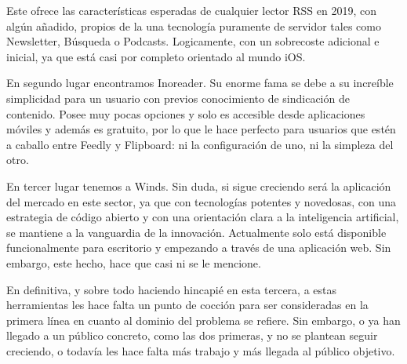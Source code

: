 Este ofrece las características esperadas de cualquier lector RSS en 2019, con algún añadido, propios de la una tecnología puramente de servidor tales como Newsletter, Búsqueda o Podcasts. Logicamente, con un sobrecoste adicional e inicial, ya que está casi por completo orientado al mundo iOS.

En segundo lugar encontramos Inoreader. Su enorme fama se debe a su increíble simplicidad para un usuario con previos conocimiento de sindicación de contenido. Posee muy pocas opciones y solo es accesible desde aplicaciones móviles y además es gratuito, por lo que le hace perfecto para usuarios que estén a caballo entre Feedly y Flipboard: ni la configuración de uno, ni la simpleza del otro.

En tercer lugar tenemos a Winds. Sin duda, si sigue creciendo será la aplicación del mercado en este sector, ya que con tecnologías potentes y novedosas, con una estrategia de código abierto y con una orientación clara a la inteligencia artificial, se mantiene a la vanguardia de la innovación. Actualmente solo está disponible funcionalmente para escritorio y empezando a través de una aplicación web. Sin embargo, este hecho, hace que casi ni se le mencione.

En definitiva, y sobre todo haciendo hincapié en esta tercera, a estas herramientas les hace falta un punto de cocción para ser consideradas en la primera línea en cuanto al dominio del problema se refiere. Sin embargo, o ya han llegado a un público concreto, como las dos primeras, y no se plantean seguir creciendo, o todavía les hace falta más trabajo y más llegada al público objetivo.